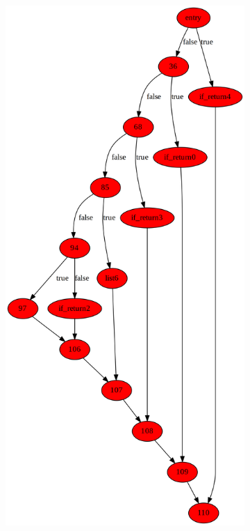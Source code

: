 \begin{figure}[htbp]
	\centering
	\begin{subfigure}[ht]{0.45\textwidth}
		\includegraphics[width=\textwidth]{inc/appendices/control_flow_analysis_example/step5_before.png}

\end{subfigure}
\end{figure}
